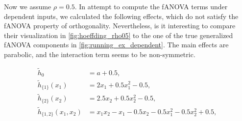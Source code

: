 Now we assume $\rho = 0.5$. In attempt to compute the fANOVA terms under dependent inputs, we calculated the following effects, which do not satisfy the fANOVA property of orthogonality. Nevertheless, is it interesting to compare their visualization in \autoref{fig:hoeffding_rho05} to the one of the true generalized fANOVA components in \autoref{fig:running_ex_dependent}.
The main effects are parabolic, and the interaction term seems to be non-symmetric.

\begin{align*}
\tilde{h}_0 &= a + 0.5, \\[3pt]
\tilde{h}_{\{1\}}(x_1) &= 2x_1 + 0.5x_1^2 - 0.5, \\[3pt]
\tilde{h}_{\{2\}}(x_2) &= 2.5x_2 + 0.5x_2^2 - 0.5, \\[3pt]
\tilde{h}_{\{1,2\}}(x_1,x_2) &= x_1x_2 - x_1 - 0.5x_2 - 0.5x_1^2 - 0.5x_2^2 + 0.5,
\end{align*}

